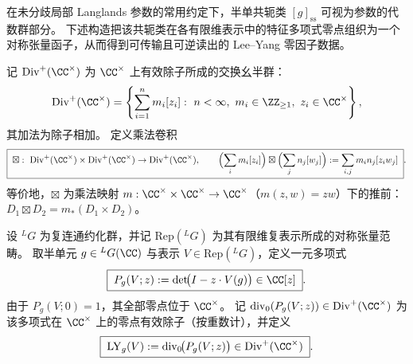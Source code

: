 \noindent
在未分歧局部 Langlands 参数的常用约定下，半单共轭类 \([g]_{\mathrm{ss}}\) 可视为参数的代数群部分。
下述构造把该共轭类在各有限维表示中的特征多项式零点组织为一个对称张量函子，从而得到可传输且可逆读出的 Lee--Yang 零因子数据。
\par

\begin{definition}\label{def:xi-leyang-zero-divisor-convolution}
记 \(\mathrm{Div}^{+}(\CC^{\times})\) 为 \(\CC^{\times}\) 上有效除子所成的交换幺半群：
\[
\mathrm{Div}^{+}(\CC^{\times})
=\left\{\sum_{i=1}^{n}m_i[z_i]:\ n<\infty,\ m_i\in\ZZ_{\ge 1},\ z_i\in\CC^{\times}\right\},
\]
其加法为除子相加。
定义乘法卷积
\begin{equation}\label{eq:xi-divisor-multiplicative-convolution}
\boxed{\;
\boxtimes:\ \mathrm{Div}^{+}(\CC^{\times})\times \mathrm{Div}^{+}(\CC^{\times})\to \mathrm{Div}^{+}(\CC^{\times}),
\qquad
\Bigl(\sum_i m_i[z_i]\Bigr)\boxtimes\Bigl(\sum_j n_j[w_j]\Bigr)
:=\sum_{i,j}m_in_j[z_iw_j]\; }.
\end{equation}
等价地，\(\boxtimes\) 为乘法映射 \(m:\CC^{\times}\times\CC^{\times}\to\CC^{\times}\)（\(m(z,w)=zw\)）下的推前：\(D_1\boxtimes D_2=m_{\ast}(D_1\times D_2)\)。
\end{definition}

\begin{definition}\label{def:xi-leyang-zero-divisor-functor}
设 \({}^{L}G\) 为复连通约化群，并记 \(\mathrm{Rep}({}^{L}G)\) 为其有限维复表示所成的对称张量范畴。
取半单元 \(g\in {}^{L}G(\CC)\) 与表示 \(V\in\mathrm{Rep}({}^{L}G)\)，定义一元多项式
\begin{equation}\label{eq:xi-leyang-characteristic-polynomial}
\boxed{\;
P_g(V;z):=\det\!\bigl(I-z\cdot V(g)\bigr)\in\CC[z]\; }.
\end{equation}
由于 \(P_g(V;0)=1\)，其全部零点位于 \(\CC^{\times}\)。
记 \(\operatorname{div}_0(P_g(V;z))\in\mathrm{Div}^{+}(\CC^{\times})\) 为该多项式在 \(\CC^{\times}\) 上的零点有效除子（按重数计），并定义
\begin{equation}\label{eq:xi-leyang-zero-divisor}
\boxed{\;
\mathrm{LY}_g(V):=\operatorname{div}_0\!\bigl(P_g(V;z)\bigr)\in\mathrm{Div}^{+}(\CC^{\times})\; }.
\end{equation}
\end{definition}

